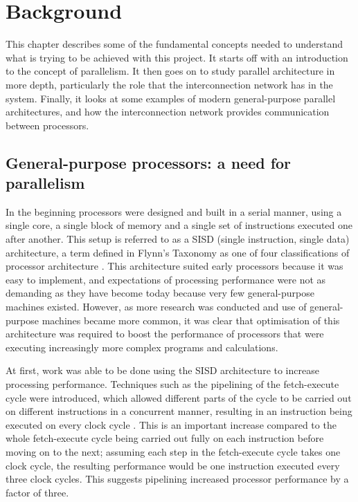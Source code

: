 \documentclass[a4paper, 12pt]{article}
\begin{document}
\newpage
\section{Background}

This chapter describes some of the fundamental concepts needed to understand what is trying to be achieved with this project. It starts off with an introduction to the concept of parallelism. It then goes on to study parallel architecture in more depth, particularly the role that the interconnection network has in the system. Finally, it looks at some examples of modern general-purpose parallel architectures, and how the interconnection network provides communication between processors.

\subsection{General-purpose processors: a need for parallelism}
\label{sec:need_parallelism}

In the beginning processors were designed and built in a serial manner, using a single core, a single block of memory and a single set of instructions executed one after another. This setup is referred to as a SISD (single instruction, single data) architecture, a term defined in Flynn's Taxonomy as one of four classifications of processor architecture \cite{Fly72}. This architecture suited early processors because it was easy to implement, and expectations of processing performance were not as demanding as they have become today because very few general-purpose machines existed. However, as more research was conducted and use of general-purpose machines became more common, it was clear that optimisation of this architecture was required to boost the performance of processors that were executing increasingly more complex programs and calculations. 

At first, work was able to be done using the SISD architecture to increase processing performance. Techniques such as the pipelining of the fetch-execute cycle were introduced, which allowed different parts of the cycle to be carried out on different instructions in a concurrent manner, resulting in an instruction being executed on every clock cycle \cite{Iba08}. This is an important increase compared to the whole fetch-execute cycle being carried out fully on each instruction before moving on to the next; assuming each step in the fetch-execute cycle takes one clock cycle, the resulting performance would be one instruction executed every three clock cycles. This suggests pipelining increased processor performance by a factor of three.
\end{document}
